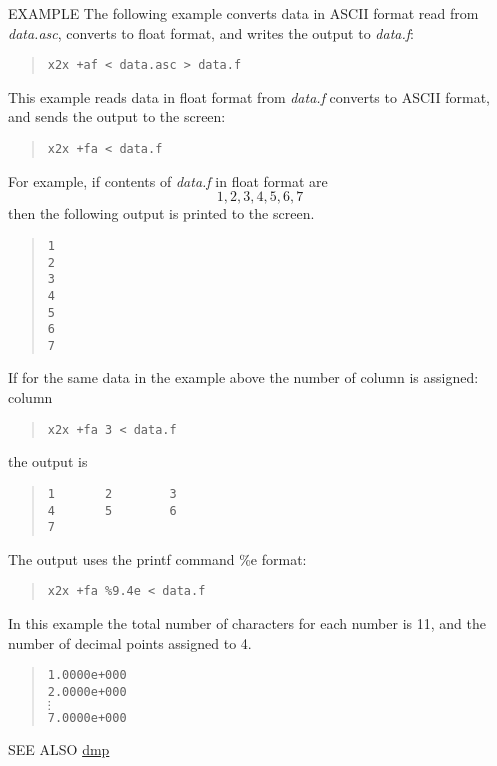 \begin{qsection}{EXAMPLE}
The following example converts data in ASCII format
read from {\em data.asc}, converts to float format,
and writes the output to {\em data.f}:
\begin{quote}
  \verb!x2x +af < data.asc > data.f!
\end{quote}
\par
This example reads data in float format from {\em data.f}
converts to ASCII format, and sends the output to the screen:
\begin{quote}
  \verb!x2x +fa < data.f!
\end{quote}
For example, if contents of {\em data.f} in float format are
\begin{displaymath}
  1, 2, 3, 4, 5, 6, 7
\end{displaymath}
then the following output is printed to the screen.
\begin{quote}
  \verb!1! \\
  \verb!2! \\
  \verb!3! \\
  \verb!4! \\
  \verb!5! \\
  \verb!6! \\
  \verb!7!
\end{quote}
\par
If for the same data in the example above
the number of column is assigned:
column
\begin{quote}
  \verb!x2x +fa 3 < data.f!
\end{quote}
the output is
\begin{quote}
  \verb!1       2        3! \\
  \verb!4       5        6! \\
  \verb!7!
\end{quote}
\par
The output uses the printf command \%e format:
\begin{quote}
  \verb!x2x +fa %9.4e < data.f!
\end{quote}
In this example the total number of characters for each number
is 11, and the number of decimal points assigned to 4.
\begin{quote}
  \verb!1.0000e+000! \\
  \verb!2.0000e+000! \\
  \mbox{\hspace{2em}}$\vdots$ \\
  \verb!7.0000e+000!
\end{quote}
\end{qsection}

\begin{qsection}{SEE ALSO}
\hyperlink{dmp}{dmp}
\end{qsection}
